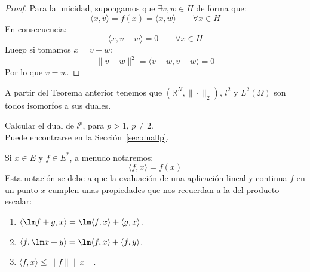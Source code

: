 \begin{teo}
\begin{proof}
        \noindent
        Para la unicidad, supongamos que $\exists v,w\in H$ de forma que:
        \begin{equation*}
            \langle x,v \rangle  = f(x) = \langle x,w \rangle  \qquad \forall x\in H
        \end{equation*}
        En consecuencia:
        \begin{equation*}
            \langle x,v-w \rangle  = 0 \qquad \forall x\in H
        \end{equation*}
        Luego si tomamos $x=v-w$:
        \begin{equation*}
            \|v-w\|^2 = \langle v-w,v-w \rangle  = 0
        \end{equation*}
        Por lo que $v=w$.
    \end{proof}
\end{teo}

\noindent
A partir del Teorema anterior tenemos que $(\mathbb{R}^N, \|\cdot \|_2)$, $l^2$ y $L^2(\Omega)$ son todos isomorfos a sus duales.

\begin{ejercicio} %
    Calcular el dual de $l^p$, para $p>1$, $p\neq 2$.\\

    \noindent
    Puede encontrarse en la Sección~\ref{sec:duallp}.
\end{ejercicio}

\begin{notacion}
    Si $x\in E$ y $f\in E^\ast$, a menudo notaremos:
    \begin{equation*}
        \langle f,x \rangle = f(x)
    \end{equation*}
    Esta notación se debe a que la evaluación de una aplicación lineal y continua $f$ en un punto $x$ cumplen unas propiedades que nos recuerdan a la del producto escalar:
    \begin{enumerate}
        \item $\langle \lm f+ g,x \rangle = \lm \langle f,x  \rangle + \langle g,x \rangle   $.
        \item $\langle f,\lm x + y\rangle = \lm \langle f,x \rangle + \langle f,y \rangle   $.
        \item $\langle f,x \rangle \leq \|f\|\|x\|$.
    \end{enumerate}
\end{notacion}

